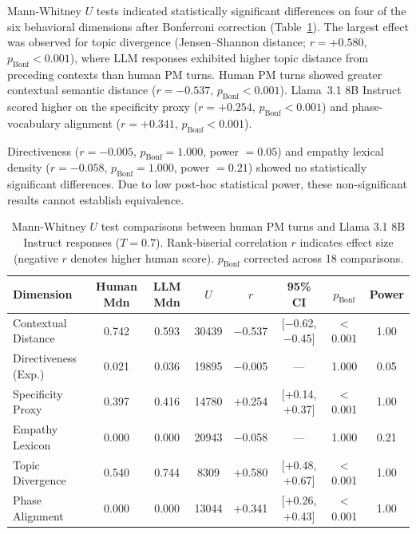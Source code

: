 \documentclass[preprint,12pt,authoryear]{elsarticle}
\begin{document}
Mann-Whitney $U$ tests indicated statistically significant differences on four of the six behavioral dimensions after Bonferroni correction (Table~\ref{tab:main_results}). The largest effect was observed for topic divergence (Jensen--Shannon distance; $r = +0.580$, $p_{\text{Bonf}} < 0.001$), where LLM responses exhibited higher topic distance from preceding contexts than human PM turns. Human PM turns showed greater contextual semantic distance ($r = -0.537$, $p_{\text{Bonf}} < 0.001$). Llama~3.1 8B Instruct scored higher on the specificity proxy ($r = +0.254$, $p_{\text{Bonf}} < 0.001$) and phase-vocabulary alignment ($r = +0.341$, $p_{\text{Bonf}} < 0.001$).

Directiveness ($r = -0.005$, $p_{\text{Bonf}} = 1.000$, power $= 0.05$) and empathy lexical density ($r = -0.058$, $p_{\text{Bonf}} = 1.000$, power $= 0.21$) showed no statistically significant differences. Due to low post-hoc statistical power, these non-significant results cannot establish equivalence.

\begin{table}[htbp]
\centering
\caption{Mann-Whitney $U$ test comparisons between human PM turns and Llama 3.1 8B Instruct responses ($T = 0.7$). Rank-biserial correlation $r$ indicates effect size (negative $r$ denotes higher human score). $p_{\text{Bonf}}$ corrected across 18 comparisons.}
\label{tab:main_results}
\small
\begin{tabular}{@{}lccccccc@{}}
\toprule
\textbf{Dimension} & \textbf{Human Mdn} & \textbf{LLM Mdn} & \textbf{$U$} & \textbf{$r$} & \textbf{95\% CI} & \textbf{$p_{\text{Bonf}}$} & \textbf{Power} \\
\midrule
Contextual Distance & 0.742 & 0.593 & 30439 & $-$0.537 & [$-$0.62, $-$0.45] & $<$0.001 & 1.00 \\
Directiveness (Exp.) & 0.021 & 0.036 & 19895 & $-$0.005 & ---                  & 1.000    & 0.05 \\
Specificity Proxy   & 0.397 & 0.416 & 14780 & +0.254   & [+0.14, +0.37]      & $<$0.001 & 1.00 \\
Empathy Lexicon     & 0.000 & 0.000 & 20943 & $-$0.058 & ---                  & 1.000    & 0.21 \\
Topic Divergence    & 0.540 & 0.744 & 8309  & +0.580   & [+0.48, +0.67]      & $<$0.001 & 1.00 \\
Phase Alignment     & 0.000 & 0.000 & 13044 & +0.341   & [+0.26, +0.43]      & $<$0.001 & 1.00 \\
\bottomrule
\end{tabular}
\end{table}
\end{document}
